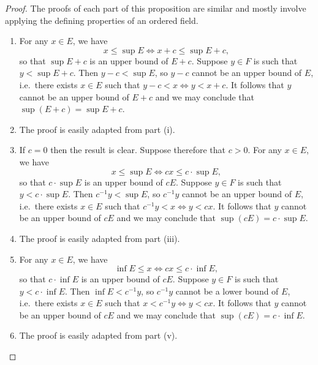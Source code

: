 \documentclass[12pt]{article}
\theoremstyle{definition}
\begin{document}
\begin{proof}
    The proofs of each part of this proposition are similar and mostly involve applying the defining properties of an ordered field.

    \begin{enumerate}[label = (\roman*)]
        \item For any \( x \in E \), we have
        \[
            x \leq \sup E \iff x + c \leq \sup E + c,
        \]
        so that \( \sup E + c \) is an upper bound of \( E + c \). Suppose \( y \in F \) is such that \( y < \sup E + c \). Then \( y - c < \sup E \), so \( y - c \) cannot be an upper bound of \( E \), i.e.\ there exists \( x \in E \) such that \( y - c < x \iff y < x + c \). It follows that \( y \) cannot be an upper bound of \( E + c \) and we may conclude that \( \sup (E + c) = \sup E + c \).

        \item The proof is easily adapted from part (i).

        \item If \( c = 0 \) then the result is clear. Suppose therefore that \( c > 0 \). For any \( x \in E \), we have
        \[
            x \leq \sup E \iff cx \leq c \cdot \sup E,
        \]
        so that \( c \cdot \sup E \) is an upper bound of \( cE \). Suppose \( y \in F \) is such that \( y < c \cdot \sup E \). Then \( c^{-1} y < \sup E \), so \( c^{-1} y \) cannot be an upper bound of \( E \), i.e.\ there exists \( x \in E \) such that \( c^{-1} y < x \iff y < cx \). It follows that \( y \) cannot be an upper bound of \( cE \) and we may conclude that \( \sup (cE) = c \cdot \sup E \).

        \item The proof is easily adapted from part (iii).

        \item For any \( x \in E \), we have
        \[
            \inf E \leq x \iff cx \leq c \cdot \inf E,
        \]
        so that \( c \cdot \inf E \) is an upper bound of \( cE \). Suppose \( y \in F \) is such that \( y < c \cdot \inf E \). Then \( \inf E < c^{-1} y \), so \( c^{-1} y \) cannot be a lower bound of \( E \), i.e.\ there exists \( x \in E \) such that \( x < c^{-1} y \iff y < cx \). It follows that \( y \) cannot be an upper bound of \( cE \) and we may conclude that \( \sup (cE) = c \cdot \inf E \).

        \item The proof is easily adapted from part (v). \qedhere
    \end{enumerate}
\end{proof}
\end{document}
